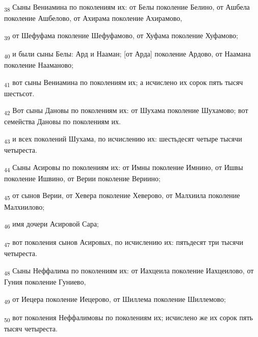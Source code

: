 \begin{tcolorbox}
\textsubscript{38} Сыны Вениамина по поколениям их: от Белы поколение Белино, от Ашбела поколение Ашбелово, от Ахирама поколение Ахирамово,
\end{tcolorbox}
\begin{tcolorbox}
\textsubscript{39} от Шефуфама поколение Шефуфамово, от Хуфама поколение Хуфамово;
\end{tcolorbox}
\begin{tcolorbox}
\textsubscript{40} и были сыны Белы: Ард и Нааман; [от Арда] поколение Ардово, от Наамана поколение Нааманово;
\end{tcolorbox}
\begin{tcolorbox}
\textsubscript{41} вот сыны Вениамина по поколениям их; а исчислено их сорок пять тысяч шестьсот.
\end{tcolorbox}
\begin{tcolorbox}
\textsubscript{42} Вот сыны Дановы по поколениям их: от Шухама поколение Шухамово; вот семейства Дановы по поколениям их.
\end{tcolorbox}
\begin{tcolorbox}
\textsubscript{43} и всех поколений Шухама, по исчислению их: шестьдесят четыре тысячи четыреста.
\end{tcolorbox}
\begin{tcolorbox}
\textsubscript{44} Сыны Асировы по поколениям их: от Имны поколение Имнино, от Ишвы поколение Ишвино, от Верии поколение Вериино;
\end{tcolorbox}
\begin{tcolorbox}
\textsubscript{45} от сынов Верии, от Хевера поколение Хеверово, от Малхиила поколение Малхиилово;
\end{tcolorbox}
\begin{tcolorbox}
\textsubscript{46} имя дочери Асировой Сара;
\end{tcolorbox}
\begin{tcolorbox}
\textsubscript{47} вот поколения сынов Асировых, по исчислению их: пятьдесят три тысячи четыреста.
\end{tcolorbox}
\begin{tcolorbox}
\textsubscript{48} Сыны Неффалима по поколениям их: от Иахцеила поколение Иахцеилово, от Гуния поколение Гуниево,
\end{tcolorbox}
\begin{tcolorbox}
\textsubscript{49} от Иецера поколение Иецерово, от Шиллема поколение Шиллемово;
\end{tcolorbox}
\begin{tcolorbox}
\textsubscript{50} вот поколения Неффалимовы по поколениям их; исчислено же их сорок пять тысяч четыреста.
\end{tcolorbox}
